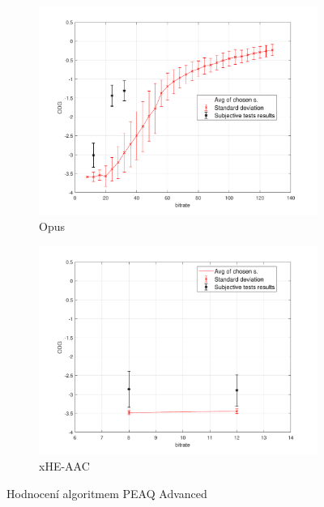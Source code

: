\begin{figure}[h]
\begin{subfigure}{.5\textwidth}
        \includegraphics[width=1\linewidth]{pic/objective/opusAdvanced.pdf}
        \caption{Opus}
        \label{app:adv:sub5}
    \end{subfigure}%
        \begin{subfigure}{.5\textwidth}
        \centering
        \includegraphics[width=1\linewidth]{pic/objective/xheAdvanced.pdf}
        \caption{xHE-AAC}
        \label{app:adv:sub6}
    \end{subfigure}%
    \caption{Hodnocení algoritmem PEAQ Advanced} 
\label{app:Advanced}
\end{figure}




